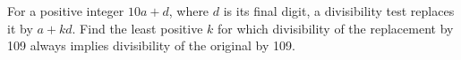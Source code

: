 For a positive integer $ 10a+d $, where $ d $ is its final digit, a divisibility test replaces it by $ a+kd $. Find the least positive $ k $ for which divisibility of the replacement by 109 always implies divisibility of the original by 109.
